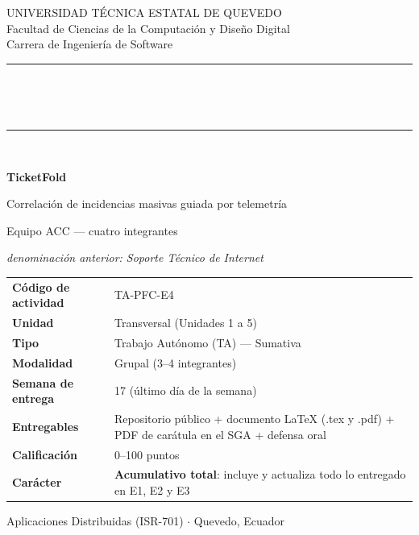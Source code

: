 \documentclass[11pt,a4paper]{article}
\begin{document}
	
	\begin{titlepage}
		\centering
		\vspace*{0.9cm}
		{\small\color{uteqGray} UNIVERSIDAD TÉCNICA ESTATAL DE QUEVEDO\\ Facultad de Ciencias de la Computación y Diseño Digital\\ Carrera de Ingeniería de Software\par}
		\vspace{16pt}
		{\color{uteqBlue}\rule{\textwidth}{2pt}}\\[8pt]
		\colorbox{uteqBlue}{\parbox{0.96\textwidth}{\centering{}\vspace{5pt}}}\\[8pt]
		{\color{uteqBlue}\rule{\textwidth}{2pt}}\\[18pt]
		{\LARGE\bfseries\color{uteqBlue} TicketFold\par}
		\vspace{5pt}
		{\large\color{uteqGray} Correlación de incidencias masivas guiada por telemetría\par}
		\vspace{4pt}
		{\normalsize\color{uteqGray} Equipo ACC --- cuatro integrantes\par}
		\vspace{3pt}
		{\footnotesize\color{uteqGray}\emph{denominación anterior: Soporte Técnico de Internet}\par}
		\vspace{22pt}
		\begin{minipage}{0.92\textwidth}
			\small
			\begin{tabular}{@{}p{4.3cm}p{9.6cm}@{}}
				\toprule
				\textbf{Código de actividad} & TA-PFC-E4 \\
				\textbf{Unidad} & Transversal (Unidades 1 a 5) \\
				\textbf{Tipo} & Trabajo Autónomo (TA) --- Sumativa \\
				\textbf{Modalidad} & Grupal (3--4 integrantes) \\
				\textbf{Semana de entrega} & 17 (último día de la semana) \\
				\textbf{Entregables} & Repositorio público + documento LaTeX (.tex y .pdf) + PDF de carátula en el SGA + defensa oral \\
				\textbf{Calificación} & 0--100 puntos \\
				\textbf{Carácter} & \textbf{Acumulativo total}: incluye y actualiza todo lo entregado en E1, E2 y E3 \\
				\bottomrule
			\end{tabular}
		\end{minipage}
		\vfill
		{\small\color{uteqGray} Aplicaciones Distribuidas (ISR-701) $\cdot$ Quevedo, Ecuador\par}
	\end{titlepage}
	
\end{document}
